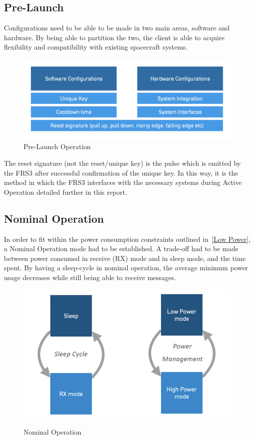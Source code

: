 \documentclass[12pt, twoside]{report}
\begin{document}
\subsection{Pre-Launch}
Configurations need to be able to be made in two main areas, software and hardware. By being able to partition the two, the client is able to acquire flexibility and compatibility with existing spacecraft systems.

\begin{figure}[h]
\caption{Pre-Launch Operation}
\centering
\includegraphics[scale = 0.4]{Pre_Launch}
\end{figure}

\par The reset signature (not the reset/unique key) is the pulse which is emitted by the FRS3 after successful confirmation of the unique key. In this way, it is the method in which the FRS3 interfaces with the necessary systems during Active Operation detailed further in this report.

\subsection{Nominal Operation}
In order to fit within the power consumption constraints outlined in~\ref{Low Power}, a Nominal Operation mode had to be established. A trade-off had to be made between power consumed in receive (RX) mode and in sleep mode, and the time spent. By having a sleep-cycle in nominal operation, the average minimum power usage decreases while still being able to receive messages.
\newline

\begin{figure}[h]
\caption{Nominal Operation}
\centering
\includegraphics[scale=0.7]{Nominal_Operation}
\label{Nominal_Operation}
\end{figure}
\end{document}

